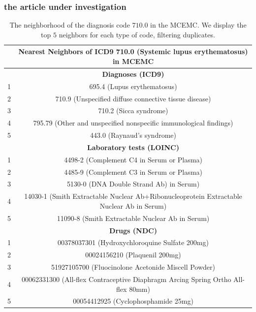 \documentclass{beamer}
\newcommand\T{\rule{0pt}{2.6ex}}       %
\begin{document}
\begin{frame}
\frametitle{the article under investigation}
\begin{table}[t]
\caption{\centering \scriptsize 
The neighborhood of the diagnosis code $710.0$ in the MCEMC. We display
the top $5$ neighbors for each type of code, filtering duplicates.\label{table:nn_diagnosis}}
\tiny
{
\begin{center}
\begin{tabular}{|c|c|}
\hline
& Nearest Neighbors of ICD9 710.0 (Systemic lupus erythematosus) in MCEMC \\
\hline
& {\bf Diagnoses (ICD9) } \T \\
\hline
1 & 695.4 (Lupus erythematosus) \T \\
2 & 710.9 (Unspecified diffuse connective tissue disease) \T \\
3 & 710.2 (Sicca syndrome) \T \\
4 & 795.79 (Other and unspecified nonspecific immunological findings) \T \\
5 & 443.0 (Raynaud's syndrome) \T \\
\hline
& {\bf Laboratory tests (LOINC) } \T \\
\hline
1 & 4498-2 (Complement C4 in Serum or Plasma) \T \\
2 & 4485-9 (Complement C3 in Serum or Plasma) \T \\
3 & 5130-0 (DNA Double Strand Ab) in Serum) \T \\
4 & 14030-1 (Smith Extractable Nuclear Ab+Ribonucleoprotein Extractable Nuclear Ab in Serum) \T \\
5 & 11090-8 (Smith Extractable Nuclear Ab in Serum) \T \\
\hline
& {\bf Drugs (NDC) } \T \\
\hline
1 & 00378037301 (Hydroxychloroquine Sulfate 200mg) \T \\
2 & 00024156210 (Plaquenil 200mg) \T \\
3 & 51927105700 (Fluocinolone Acetonide Miscell Powder) \T \\
4 & 00062331300 (All-flex Contraceptive Diaphragm Arcing Spring Ortho All-flex 80mm) \T \\
5 & 00054412925 (Cyclophosphamide 25mg) \T \\
\hline
\end{tabular}
\end{center}
}
\end{table}
\end{frame}
\end{document}
